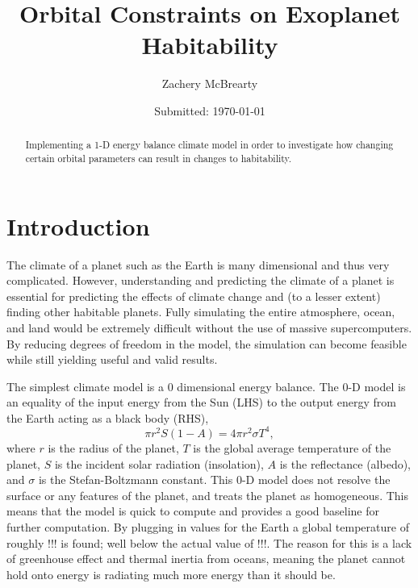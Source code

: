 \documentclass[12pt, onecolumn]{revtex4-2}    %
\begin{document}
\title{Orbital Constraints on Exoplanet Habitability}
\date{Submitted: \today{}}
\author{Zachery McBrearty}

\begin{abstract}

    Implementing a 1-D energy balance climate model in order to investigate how changing certain orbital parameters can result in changes to habitability.

\end{abstract}


\maketitle

\tableofcontents

\newpage

\section{Introduction}

The climate of a planet such as the Earth is many dimensional and thus very complicated.
However, understanding and predicting the climate of a planet is essential for predicting the effects of climate change and (to a lesser extent) finding other habitable planets.
Fully simulating the entire atmosphere, ocean, and land would be extremely difficult without the use of massive supercomputers.
By reducing degrees of freedom in the model, the simulation can become feasible while still yielding useful and valid results.

The simplest climate model is a 0 dimensional energy balance.
The 0-D model is an equality of the input energy from the Sun (LHS) to the output energy from the Earth acting as a black body (RHS),
$$
    \pi r^2 S(1-A) = 4 \pi r^2 \sigma T^4,
$$
where $r$ is the radius of the planet, $T$ is the global average temperature of the planet, $S$ is the incident solar radiation (insolation), $A$ is the reflectance (albedo), and $\sigma$ is the Stefan-Boltzmann constant.
This 0-D model does not resolve the surface or any features of the planet, and treats the planet as homogeneous.
This means that the model is quick to compute and provides a good baseline for further computation.
By plugging in values for the Earth a global temperature of roughly !!! is found; well below the actual value of !!!.
The reason for this is a lack of greenhouse effect and thermal inertia from oceans, meaning the planet cannot hold onto energy is radiating much more energy than it should be.
\end{document}
